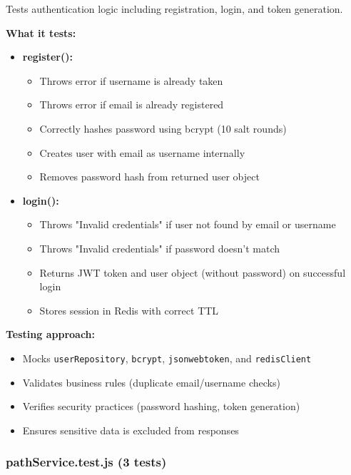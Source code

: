 Tests authentication logic including registration, login, and token generation.

\textbf{What it tests:}
\begin{itemize}
    \item \textbf{register():}
    \begin{itemize}
        \item Throws error if username is already taken
        \item Throws error if email is already registered
        \item Correctly hashes password using bcrypt (10 salt rounds)
        \item Creates user with email as username internally
        \item Removes password hash from returned user object
    \end{itemize}
    
    \item \textbf{login():}
    \begin{itemize}
        \item Throws "Invalid credentials" if user not found by email or username
        \item Throws "Invalid credentials" if password doesn't match
        \item Returns JWT token and user object (without password) on successful login
        \item Stores session in Redis with correct TTL
    \end{itemize}
\end{itemize}

\textbf{Testing approach:}
\begin{itemize}
    \item Mocks \texttt{userRepository}, \texttt{bcrypt}, \texttt{jsonwebtoken}, and \texttt{redisClient}
    \item Validates business rules (duplicate email/username checks)
    \item Verifies security practices (password hashing, token generation)
    \item Ensures sensitive data is excluded from responses
\end{itemize}

\subsubsection{pathService.test.js (3 tests)}
\label{subsubsec:path_service_test}

